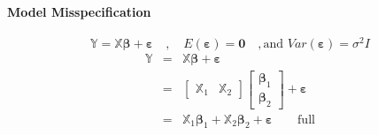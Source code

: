 \documentclass{article}
\begin{document}
\bigskip

\paragraph{Model Misspecification}

\begin{equation*}
\mathbb{Y}=\mathbb{X}\boldsymbol{\beta }+\boldsymbol{\varepsilon }\quad
,\quad E\left( \boldsymbol{\varepsilon }\right) =\boldsymbol{0}\quad ,\text{
and }Var\left( \boldsymbol{\varepsilon }\right) =\sigma ^{2}I
\end{equation*}%
\begin{eqnarray*}
\mathbb{Y} &=&\mathbb{X}\boldsymbol{\beta }+\boldsymbol{\varepsilon } \\
&=&\left[ 
\begin{array}{cc}
\mathbb{X}_{1} & \mathbb{X}_{2}%
\end{array}%
\right] \left[ 
\begin{array}{c}
\boldsymbol{\beta }_{1} \\ 
\boldsymbol{\beta }_{2}%
\end{array}%
\right] +\boldsymbol{\varepsilon } \\
&=&\mathbb{X}_{1}\boldsymbol{\beta }_{1}+\mathbb{X}_{2}\boldsymbol{\beta }%
_{2}+\boldsymbol{\varepsilon }\quad \quad \text{full}
\end{eqnarray*}

\bigskip
\end{document}
